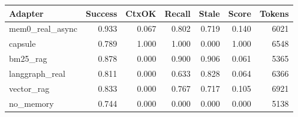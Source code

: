 \begin{tabular}{lrrrrrr}
\hline
Adapter & Success & CtxOK & Recall & Stale & Score & Tokens \\
\hline
mem0\_real\_async & 0.933 & 0.067 & 0.802 & 0.719 & 0.140 & 6021 \\
capsule & 0.789 & 1.000 & 1.000 & 0.000 & 1.000 & 6548 \\
bm25\_rag & 0.878 & 0.000 & 0.900 & 0.906 & 0.061 & 5365 \\
langgraph\_real & 0.811 & 0.000 & 0.633 & 0.828 & 0.064 & 6366 \\
vector\_rag & 0.833 & 0.000 & 0.767 & 0.717 & 0.105 & 6921 \\
no\_memory & 0.744 & 0.000 & 0.000 & 0.000 & 0.000 & 5138 \\
\hline
\end{tabular}
